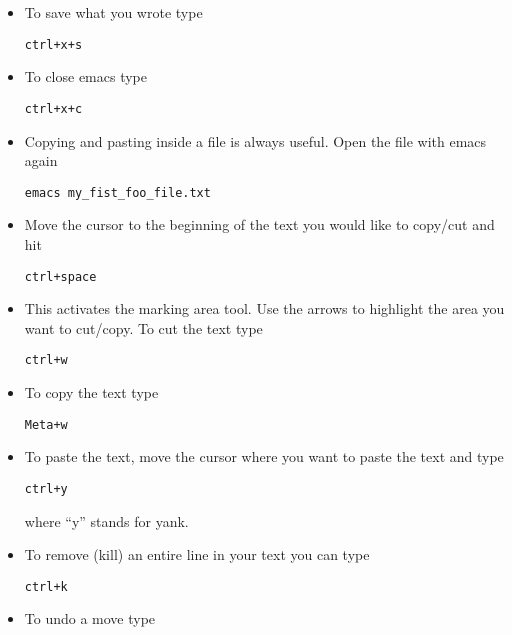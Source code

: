 \documentclass[aps,showpacs,prd,notitlepage,preprintnumbers,amsmath,amssymb,letterpaper]{revtex4}
\begin{document}
\begin{itemize}
  
\item To save what you wrote type 

\begin{verbatim}
ctrl+x+s
\end{verbatim}

\item To close emacs type

\begin{verbatim}
ctrl+x+c
\end{verbatim}

\item Copying and pasting inside a file is always useful. Open the file with emacs again

\begin{verbatim}
emacs my_fist_foo_file.txt
\end{verbatim}

\item Move the cursor to the beginning of the text you would like to copy/cut and hit

\begin{verbatim}
ctrl+space
\end{verbatim}

\item This activates the marking area tool. Use the arrows to highlight the area you want to cut/copy.
To cut the text type

\begin{verbatim}
ctrl+w
\end{verbatim}

\item To copy the text type

\begin{verbatim}
Meta+w
\end{verbatim}


\item To paste the text, move the cursor where you want to paste the text and type

\begin{verbatim}
ctrl+y
\end{verbatim}

where ``y'' stands for yank.

\item To remove (kill) an entire line in your text you can type

\begin{verbatim}
ctrl+k
\end{verbatim}

\item To undo a move type


\end{itemize}
\end{document}
